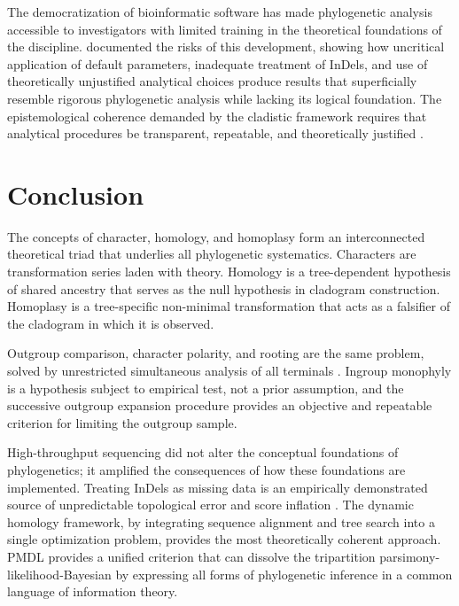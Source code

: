 The democratization of bioinformatic software has made phylogenetic analysis accessible to investigators with limited training in the theoretical foundations of the discipline. \textcite{grant2003} documented the risks of this development, showing how uncritical application of default parameters, inadequate treatment of InDels, and use of theoretically unjustified analytical choices produce results that superficially resemble rigorous phylogenetic analysis while lacking its logical foundation. The epistemological coherence demanded by the cladistic framework requires that analytical procedures be transparent, repeatable, and theoretically justified \parencite{wheeleretal2006}.

\section{Conclusion}

The concepts of character, homology, and homoplasy form an interconnected theoretical triad that underlies all phylogenetic systematics. Characters are transformation series laden with theory. Homology is a tree-dependent hypothesis of shared ancestry that serves as the null hypothesis in cladogram construction. Homoplasy is a tree-specific non-minimal transformation that acts as a falsifier of the cladogram in which it is observed.

Outgroup comparison, character polarity, and rooting are the same problem, solved by unrestricted simultaneous analysis of all terminals \parencite{nixon1993}. Ingroup monophyly is a hypothesis subject to empirical test, not a prior assumption, and the successive outgroup expansion procedure \parencite{grant2019} provides an objective and repeatable criterion for limiting the outgroup sample.

High-throughput sequencing did not alter the conceptual foundations of phylogenetics; it amplified the consequences of how these foundations are implemented. Treating InDels as missing data is an empirically demonstrated source of unpredictable topological error and score inflation \parencite{jacobmachado2021c}. The dynamic homology framework, by integrating sequence alignment and tree search into a single optimization problem, provides the most theoretically coherent approach. PMDL \parencite{wheelervaron2025} provides a unified criterion that can dissolve the tripartition parsimony-likelihood-Bayesian by expressing all forms of phylogenetic inference in a common language of information theory.


